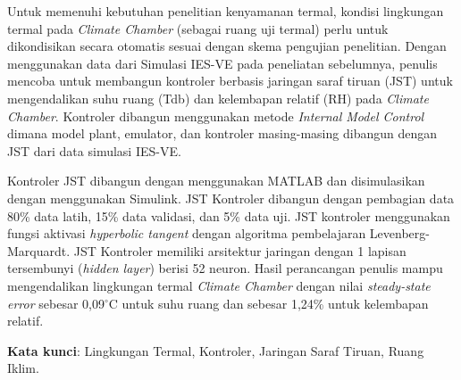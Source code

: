 Untuk memenuhi kebutuhan penelitian kenyamanan termal, kondisi lingkungan termal pada \textit{Climate Chamber} (sebagai ruang uji termal) perlu untuk dikondisikan secara otomatis sesuai dengan skema pengujian penelitian. Dengan menggunakan data dari Simulasi IES-VE pada peneliatan sebelumnya\cite{skripsiIchfan}, penulis mencoba untuk membangun kontroler berbasis jaringan saraf tiruan (JST) untuk mengendalikan suhu ruang (Tdb) dan kelembapan relatif (RH) pada \textit{Climate Chamber}. Kontroler dibangun menggunakan metode \textit{Internal Model Control} dimana model plant, emulator, dan kontroler masing-masing dibangun dengan JST dari data simulasi IES-VE.

Kontroler JST dibangun dengan menggunakan MATLAB dan disimulasikan dengan menggunakan Simulink. JST Kontroler dibangun dengan pembagian data 80\% data latih, 15\% data validasi, dan 5\% data uji. JST kontroler menggunakan fungsi aktivasi \textit{hyperbolic tangent} dengan algoritma pembelajaran Levenberg-Marquardt. JST Kontroler memiliki arsitektur jaringan dengan 1 lapisan tersembunyi (\textit{hidden layer}) berisi 52 neuron. Hasil perancangan penulis mampu mengendalikan lingkungan termal \textit{Climate Chamber} dengan nilai \textit{steady-state error} sebesar 0,09$^\circ$C untuk suhu ruang dan sebesar 1,24\% untuk kelembapan relatif.

\vspace{0.5cm}
\hspace{-1.2cm}
\textbf{Kata kunci}: Lingkungan Termal, Kontroler, Jaringan Saraf Tiruan, Ruang Iklim.


